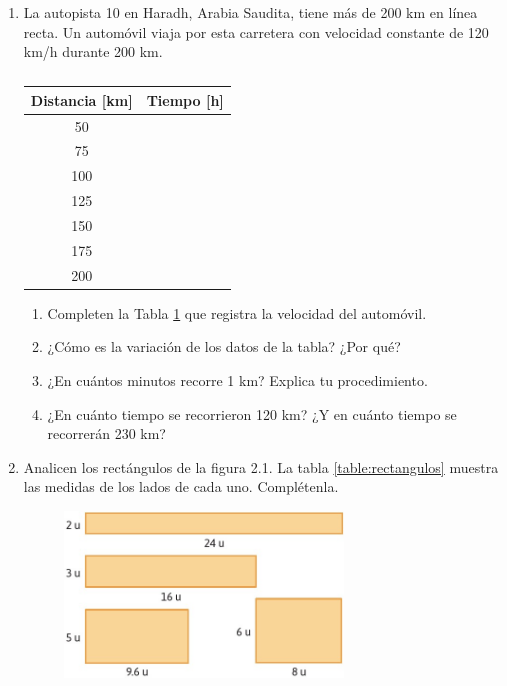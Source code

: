 \documentclass[11pt]{book}
\begin{document}
\begin{enumerate}
  \item La autopista 10 en Haradh, Arabia Saudita, tiene más de 200
        km en línea recta. Un automóvil viaja por esta carretera con
        velocidad constante de 120 km/h durante 200 km.
        \begin{table}[!h]
          \centering
          \begin{tabular}{|c|c|}
            \hline
            Distancia [km] & Tiempo [h] \\
            \hline\rowcolor{colorrds!20}
            50             &            \\
            \hline
            75             &            \\
            \hline\rowcolor{colorrds!20}
            100            &            \\
            \hline
            125            &            \\
            \hline\rowcolor{colorrds!20}
            150            &            \\
            \hline
            175            &            \\
            \hline\rowcolor{colorrds!20}
            200            &            \\
            \hline
          \end{tabular}
          \caption{}
          \label{table:arabia}
        \end{table}
        \begin{enumerate}
          \item Completen la Tabla \ref{table:arabia} que registra la velocidad del automóvil.
          \item ¿Cómo es la variación de los datos de la tabla? ¿Por qué?
          \item ¿En cuántos minutos recorre 1 km? Explica tu procedimiento.
          \item ¿En cuánto tiempo se recorrieron 120 km? ¿Y en cuánto tiempo se recorrerán 230 km?
        \end{enumerate}

  \item Analicen los rectángulos de la figura 2.1. La tabla \ref{table:rectangulos} muestra las medidas de los lados de cada uno. Complétenla.
        \begin{figure}[H]
          \centering
          \includegraphics[width=0.7\textwidth]{ejem10.2}
        \end{figure}


\end{enumerate}
\end{document}
